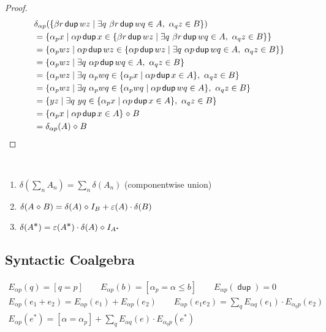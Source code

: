 \documentclass{article}
\renewcommand\smash{\mathrel{\diamond}}
\newcommand\ssum{\mathop{\textstyle\sum}}
\newcommand\pdup{\mathop{\mathsf{dup}}}
\newcommand\bval[1]{[#1]}
\renewcommand\star{^{\textstyle *}}
\begin{document}
\begin{proof}
\begin{align*}
& \delta_{\alpha p}(\set{\beta r\pdup wz}{\exists q\ \beta r\pdup wq\in A,\ \alpha_qz\in B})\\
&= \set{\alpha_p x}{\alpha p\pdup x\in\set{\beta r\pdup wz}{\exists q\ \beta r\pdup wq\in A,\ \alpha_qz\in B}}\\
&= \set{\alpha_p wz}{\alpha p\pdup wz\in\set{\alpha p\pdup wz}{\exists q\ \alpha p\pdup wq\in A,\ \alpha_qz\in B}}\\
&= \set{\alpha_p wz}{\exists q\ \alpha p\pdup wq\in A,\ \alpha_qz\in B}\\
&= \set{\alpha_p wz}{\exists q\ \alpha_p wq\in\set{\alpha_p x}{\alpha p\pdup x\in A},\ \alpha_qz\in B}\\
&= \set{\alpha_p wz}{\exists q\ \alpha_p wq\in\set{\alpha_p wq}{\alpha p\pdup wq\in A},\ \alpha_qz\in B}\\
&= \set{yz}{\exists q\ yq\in\set{\alpha_p x}{\alpha p\pdup x\in A},\ \alpha_qz\in B}\\
&= \set{\alpha_p x}{\alpha p\pdup x\in A}\smash B\\
&= \delta_{\alpha p}(A)\smash B
\end{align*}
\end{proof}

\begin{lemma}\ 
\begin{enumerate}
\romanize
\item
$\delta(\ssum_n A_n)= \ssum_n \delta(A_n)$ (componentwise union)
\item
$\delta(A\smash B) = \delta(A)\smash I_B + \eps(A)\cdot\delta(B)$
\item
$\delta(A\star) = \eps(A\star)\cdot\delta(A)\smash I_{A^*}$
\end{enumerate}
\end{lemma}

\subsection*{Syntactic Coalgebra}

\begin{gather*}
E_{\alpha p}(q) = \bval{q = p} \qquad
E_{\alpha p}(b) = \bval{\alpha_p=\alpha\leq b} \qquad
E_{\alpha p}(\pdup) = 0\\
E_{\alpha p}(e_1+e_2) = E_{\alpha p}(e_1)+E_{\alpha p}(e_2) \qquad
E_{\alpha p}(e_1e_2) = \ssum_{q} E_{\alpha q}(e_1)\cdot E_{\alpha_q p}(e_2)\\
E_{\alpha p}(e\star) = \bval{\alpha=\alpha_p} + \ssum_{q} E_{\alpha q}(e)\cdot E_{\alpha_q p}(e\star)
\end{gather*}
\end{document}
